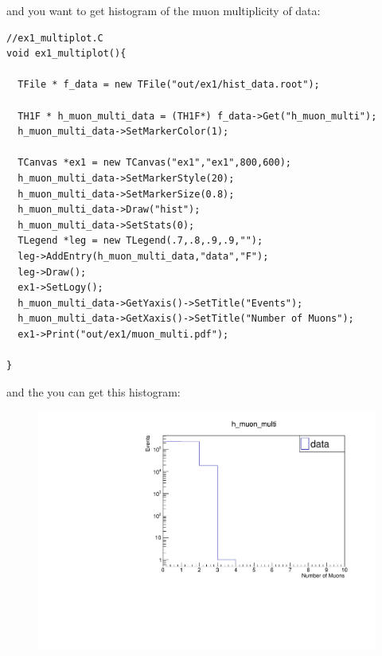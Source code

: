 \documentclass[11pt]{article}
\begin{document}
and you want to get histogram of the muon multiplicity of data:
\begin{lstlisting}[emph={if,while,continue,new},emphstyle=\color{nut}]
//ex1_multiplot.C
void ex1_multiplot(){

  TFile * f_data = new TFile("out/ex1/hist_data.root");

  TH1F * h_muon_multi_data = (TH1F*) f_data->Get("h_muon_multi");
  h_muon_multi_data->SetMarkerColor(1);

  TCanvas *ex1 = new TCanvas("ex1","ex1",800,600);
  h_muon_multi_data->SetMarkerStyle(20);
  h_muon_multi_data->SetMarkerSize(0.8);
  h_muon_multi_data->Draw("hist");
  h_muon_multi_data->SetStats(0);
  TLegend *leg = new TLegend(.7,.8,.9,.9,"");
  leg->AddEntry(h_muon_multi_data,"data","F");
  leg->Draw();
  ex1->SetLogy();
  h_muon_multi_data->GetYaxis()->SetTitle("Events");
  h_muon_multi_data->GetXaxis()->SetTitle("Number of Muons");
  ex1->Print("out/ex1/muon_multi.pdf");

}

\end{lstlisting}
and the you can get this histogram:
\begin{figure}[h]
\centering
\includegraphics[width=15cm]{muon_multi_data.pdf}
\end{figure}

\newpage
\end{document}
